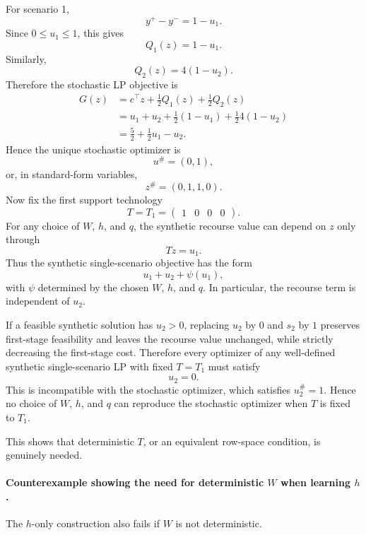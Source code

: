 \documentclass{article}
\newcommand{\1}{\mathbf{1}}
\theoremstyle{plain}
\theoremstyle{definition}
\theoremstyle{remark}
\begin{document}
For scenario 1,
\[
y^+-y^-=1-u_1.
\]
Since $0\leq u_1\leq 1$, this gives
\[
Q_1(z)=1-u_1.
\]
Similarly,
\[
Q_2(z)=4(1-u_2).
\]
Therefore the stochastic LP objective is
\[
\begin{aligned}
G(z)
&=c^\top z+\frac{1}{2}Q_1(z)+\frac{1}{2}Q_2(z)\\
&=u_1+u_2+\frac{1}{2}(1-u_1)+\frac{1}{2}4(1-u_2)\\
&=\frac{5}{2}+\frac{1}{2}u_1-u_2.
\end{aligned}
\]
Hence the unique stochastic optimizer is
\[
u^\#=(0,1),
\]
or, in standard-form variables,
\[
z^\#=(0,1,1,0).
\]
Now fix the first support technology
\[
T=T_1=
\begin{pmatrix}
1&0&0&0
\end{pmatrix}.
\]
For any choice of $W$, $h$, and $q$, the synthetic recourse value can depend on $z$ only through
\[
Tz=u_1.
\]
Thus the synthetic single-scenario objective has the form
\[
u_1+u_2+\psi(u_1),
\]
with $\psi$ determined by the chosen $W$, $h$, and $q$. In particular, the recourse term is independent of $u_2$.

If a feasible synthetic solution has $u_2>0$, replacing $u_2$ by $0$ and $s_2$ by $1$ preserves first-stage feasibility and leaves the recourse value unchanged, while strictly decreasing the first-stage cost. Therefore every optimizer of any well-defined synthetic single-scenario LP with fixed $T=T_1$ must satisfy
\[
u_2=0.
\]
This is incompatible with the stochastic optimizer, which satisfies $u_2^\#=1$. Hence no choice of $W$, $h$, and $q$ can reproduce the stochastic optimizer when $T$ is fixed to $T_1$.

This shows that deterministic $T$, or an equivalent row-space condition, is genuinely needed.

\paragraph{Counterexample showing the need for deterministic $W$ when learning $h$.}
\label{app:deterministic-W-counterexample}

The $h$-only construction also fails if $W$ is not deterministic.
\end{document}
